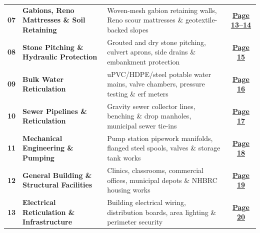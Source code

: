 \documentclass[a4paper,11pt]{article}
\begin{document}
\begin{tabularx}{\textwidth}{@{}l p{4.6cm} X c@{}}
\rowcolor{mhbluelight}
\fontsize{7.5pt}{9.1pt}\selectfont\bfseries 07 & \fontsize{7.5pt}{9.1pt}\selectfont\bfseries Gabions, Reno Mattresses \& Soil Retaining & \fontsize{7.5pt}{9.1pt}\selectfont Woven-mesh gabion retaining walls, Reno scour mattresses \& geotextile-backed slopes & \fontsize{7.5pt}{9.1pt}\selectfont\hyperlink{sec:gabions}{\bfseries\color{mhblue}Page 13--14} \\
\fontsize{7.5pt}{9.1pt}\selectfont\bfseries 08 & \fontsize{7.5pt}{9.1pt}\selectfont\bfseries Stone Pitching \& Hydraulic Protection & \fontsize{7.5pt}{9.1pt}\selectfont Grouted and dry stone pitching, culvert aprons, side drains \& embankment protection & \fontsize{7.5pt}{9.1pt}\selectfont\hyperlink{sec:pitching}{\bfseries\color{mhblue}Page 15} \\
\rowcolor{mhbluelight}
\fontsize{7.5pt}{9.1pt}\selectfont\bfseries 09 & \fontsize{7.5pt}{9.1pt}\selectfont\bfseries Bulk Water Reticulation & \fontsize{7.5pt}{9.1pt}\selectfont uPVC/HDPE/steel potable water mains, valve chambers, pressure testing \& erf meters & \fontsize{7.5pt}{9.1pt}\selectfont\hyperlink{sec:waterretic}{\bfseries\color{mhblue}Page 16} \\
\fontsize{7.5pt}{9.1pt}\selectfont\bfseries 10 & \fontsize{7.5pt}{9.1pt}\selectfont\bfseries Sewer Pipelines \& Reticulation & \fontsize{7.5pt}{9.1pt}\selectfont Gravity sewer collector lines, benching \& drop manholes, municipal sewer tie-ins & \fontsize{7.5pt}{9.1pt}\selectfont\hyperlink{sec:sewer}{\bfseries\color{mhblue}Page 17} \\
\rowcolor{mhbluelight}
\fontsize{7.5pt}{9.1pt}\selectfont\bfseries 11 & \fontsize{7.5pt}{9.1pt}\selectfont\bfseries Mechanical Engineering \& Pumping & \fontsize{7.5pt}{9.1pt}\selectfont Pump station pipework manifolds, flanged steel spools, valves \& storage tank works & \fontsize{7.5pt}{9.1pt}\selectfont\hyperlink{sec:mechanical}{\bfseries\color{mhblue}Page 18} \\
\fontsize{7.5pt}{9.1pt}\selectfont\bfseries 12 & \fontsize{7.5pt}{9.1pt}\selectfont\bfseries General Building \& Structural Facilities & \fontsize{7.5pt}{9.1pt}\selectfont Clinics, classrooms, commercial offices, municipal depots \& NHBRC housing works & \fontsize{7.5pt}{9.1pt}\selectfont\hyperlink{sec:building}{\bfseries\color{mhblue}Page 19} \\
\rowcolor{mhbluelight}
\fontsize{7.5pt}{9.1pt}\selectfont\bfseries 13 & \fontsize{7.5pt}{9.1pt}\selectfont\bfseries Electrical Reticulation \& Infrastructure & \fontsize{7.5pt}{9.1pt}\selectfont Building electrical wiring, distribution boards, area lighting \& perimeter security & \fontsize{7.5pt}{9.1pt}\selectfont\hyperlink{sec:electrical}{\bfseries\color{mhblue}Page 20} \\
\end{tabularx}
\renewcommand{\arraystretch}{1}
\end{document}

